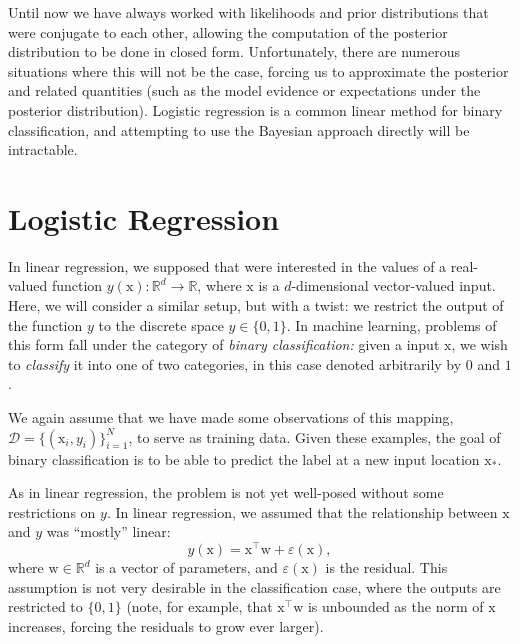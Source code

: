 \documentclass{article}
\newcommand{\mc}[1]{\mathcal{#1}}
\newcommand{\data}{\mc{D}}
\newcommand{\trans}{^\top}
\renewcommand{\vec}[1]{\bm{\mathrm{#1}}}
\newcommand{\R}{\mathbb{R}}
\renewcommand{\epsilon}{\varepsilon}
\begin{document}
Until now we have always worked with likelihoods and prior
distributions that were conjugate to each other, allowing the
computation of the posterior distribution to be done in closed form.
Unfortunately, there are numerous situations where this will not be
the case, forcing us to approximate the posterior and related
quantities (such as the model evidence or expectations under the
posterior distribution).  Logistic regression is a common linear
method for binary classification, and attempting to use the Bayesian
approach directly will be intractable.

\section*{Logistic Regression}

In linear regression, we supposed that were interested in the values
of a real-valued function $y(\vec{x})\colon \R^d \to \R$, where
$\vec{x}$ is a $d$-dimensional vector-valued input.  Here, we will
consider a similar setup, but with a twist: we restrict the output of
the function $y$ to the discrete space $y \in \{0, 1\}$.  In machine
learning, problems of this form fall under the category of
\emph{binary classification:} given a input $\vec{x}$, we wish to
\emph{classify} it into one of two categories, in this case denoted
arbitrarily by $0$ and $1$.

We again assume that we have made some observations of this mapping,
$\data = \bigl\{ (\vec{x}_i, y_i) \bigr\}_{i = 1}^N$, to serve as
training data.  Given these examples, the goal of binary
classification is to be able to predict the label at a new input
location $\vec{x}_\ast$.

As in linear regression, the problem is not yet well-posed without
some restrictions on $y$.  In linear regression, we assumed that the
relationship between $\vec{x}$ and $y$ was ``mostly'' linear:
\begin{equation*}
  y(\vec{x}) = \vec{x}\trans \vec{w} + \epsilon(\vec{x}),
\end{equation*}
where $\vec{w} \in \R^d$ is a vector of parameters, and
$\epsilon(\vec{x})$ is the residual.  This assumption is not very
desirable in the classification case, where the outputs are restricted
to $\{0, 1\}$ (note, for example, that $\vec{x}\trans \vec{w}$ is
unbounded as the norm of $\vec{x}$ increases, forcing the residuals to
grow ever larger).
\end{document}
